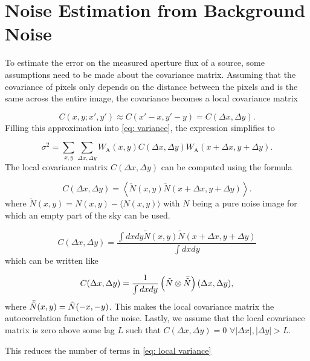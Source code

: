 \newpage
\section{Noise Estimation from Background Noise}\label{subsec: Noise Estimation from background Noise}

To estimate the error on the measured aperture flux of a source, some assumptions need to be made about the covariance matrix. 
Assuming that the covariance of pixels only depends on the distance between the pixels and is the same across the entire image, the covariance becomes a local covariance matrix

\begin{equation}
    C(x,y;x',y') \approx C(x'-x,y'-y)=C(\Delta x, \Delta y).
\end{equation}
Filling this approximation into \autoref{eq: variance}, the expression simplifies to 

\begin{equation}\label{eq: local variance}
    \sigma^2 = \sum_{x,y}\sum_{\Delta x,\Delta y}W_\mathrm{A}(x,y)C(\Delta x, \Delta y)W_\mathrm{A}(x+\Delta x,y + \Delta y).
\end{equation}
The local covariance matrix $C(\Delta x, \Delta y)$ can be computed using the formula

\begin{equation}
    C(\Delta x, \Delta y) = \left\langle \tilde{N}(x,y)\tilde{N}(x+\Delta x,y+\Delta y)\right\rangle.
\end{equation}
where $\tilde{N}(x,y)=N(x,y) - \langle N(x,y)\rangle$ with $N$ being a pure noise image for which an empty part of the sky can be used.

\begin{equation}
    C(\Delta x, \Delta y) = \frac{\int dx dy \tilde{N}(x,y)\tilde{N}(x+\Delta x,y+\Delta y)}{\int dx dy} 
\end{equation}
which can be written like

\begin{equation}
    C(\Delta x, \Delta y) = \frac{1}{\int dx dy}\left(\tilde{N} \otimes\Bar{\tilde{N}}\right)(\Delta x, \Delta y),
\end{equation}
where $\Bar{\tilde{N}}(x,y)=\tilde{N}(-x,-y)$. This makes the local covariance matrix the autocorrelation function of the noise.
Lastly, we assume that the local covariance matrix is zero above some lag $L$ such that $C(\Delta x, \Delta y) = 0$ $\forall|\Delta x|, |\Delta y| > L$.

\noindent This reduces the number of terms in \autoref{eq: local variance}

